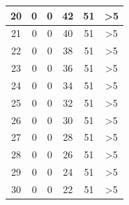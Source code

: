 \begin{longtable}{|c|c|c|c|c|c|}
		20                                           & 0                      & 0                     & 42                    & 51                     & >5                                        \\ \hline
		21                                           & 0                      & 0                     & 40                    & 51                     & >5                                               \\ \hline
		22                                           & 0                      & 0                     & 38                    & 51                     & >5                                        \\ \hline
		23                                           & 0                      & 0                     & 36                    & 51                     & >5                                        \\ \hline
		24                                           & 0                      & 0                     & 34                    & 51                     & >5                                                 \\ \hline
		25                                           & 0                      & 0                     & 32                    & 51                     & >5                                            \\ \hline
		26                                           & 0                      & 0                     & 30                    & 51                     & >5                                                 \\ \hline
		27                                           & 0                      & 0                     & 28                    & 51                     & >5                                        \\ \hline
		28                                           & 0                      & 0                     & 26                    & 51                     & >5                                        \\ \hline
		29                                           & 0                      & 0                     & 24                    & 51                     & >5                                              \\ \hline
		30                                           & 0                      & 0                     & 22                    & 51                     & >5                                        \\ \hline

\end{longtable}
